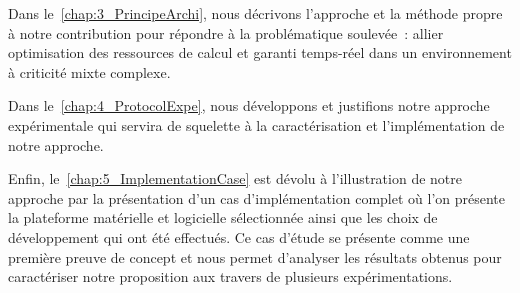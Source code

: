 \documentclass[french, a4paper, 11pt, twoside, pdftex]{StyleThese}
\begin{document}
Dans le~\autoref{chap:3_PrincipeArchi}, nous décrivons l'approche et la méthode propre à notre contribution pour répondre à la problématique soulevée~: allier optimisation des ressources de calcul et garanti temps-réel dans un environnement à criticité mixte complexe.

Dans le~\autoref{chap:4_ProtocolExpe}, nous développons et justifions notre approche expérimentale qui servira de squelette à la caractérisation et l'implémentation de notre approche.

Enfin, le~\autoref{chap:5_ImplementationCase} est dévolu à l’illustration de notre approche par la présentation d'un cas d'implémentation complet où l'on présente la plateforme matérielle et logicielle sélectionnée ainsi que les choix de développement qui ont été effectués. Ce cas d'étude se présente comme une première preuve de concept et nous permet d'analyser les résultats obtenus pour caractériser notre proposition aux travers de plusieurs expérimentations. 
\end{document}
